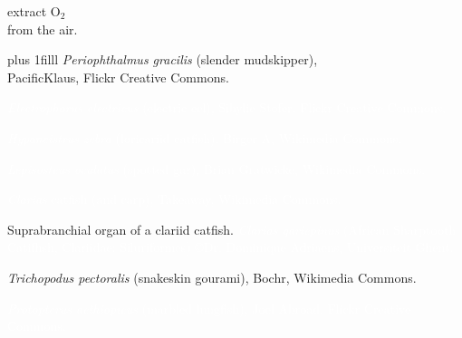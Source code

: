 \documentclass[t]{beamer}
\begin{document}
{
\begin{frame}[b,plain]

\vspace{5\baselineskip}

\hangpara\Large\hspace{64mm} extract O$_2$\\
\hspace{64mm}from the air.

\vskip0pt plus 1filll
\hfill\tiny\textit{Periophthalmus gracilis} (slender mudskipper),\\
\hfill PacificKlaus, Flickr Creative Commons.
\end{frame}
}

{
\begin{frame}[b,plain]
\hfill\tiny\textcolor{white}{\textit{Electrophorus electricus} (electric eel), Sibylie Stofer, Flickr Creative Commons.}
\end{frame}
}

{
\begin{frame}[b,plain]
\tiny\textcolor{white}{\textit{Hypancistrus zebra} (loricariid catfish), Birger A, Wikimedia Commons.}
\end{frame}
}

{
\begin{frame}[b,plain]
\tiny\textcolor{white}{\textit{Lepisosteus oculatus} (spotted gar), Brian Gratwicke, Wikimedia Commons.}
\end{frame}
}


{
\begin{frame}[b,plain]
\hfill\tiny\textcolor{white}{\textit{Clarias} catfish (and carp), Takeaway, Wikimedia Commons.}
\end{frame}
}

{
\begin{frame}[b,plain]{Suprabranchial organ of a clariid catfish.}
\tiny\textcolor{white}{\textit{Clarias gariepinus} (African Sharptooth Catifhsh, Clariidae: Siluriformes) \copyright Dr. Dominique Adriaens, Universiteit Ghent.}
\end{frame}
}

{
\begin{frame}[b,plain]
\hfill\tiny\textit{Trichopodus pectoralis} (snakeskin gourami), Bochr, Wikimedia Commons.
\end{frame}
}

{
\begin{frame}[b,plain]
\tiny\textcolor{white}{\textit{Protopterus aethiopicus} (marbled lungfish), Joel Abroad, Flickr Creative Commons.}
\end{frame}
}
\end{document}
